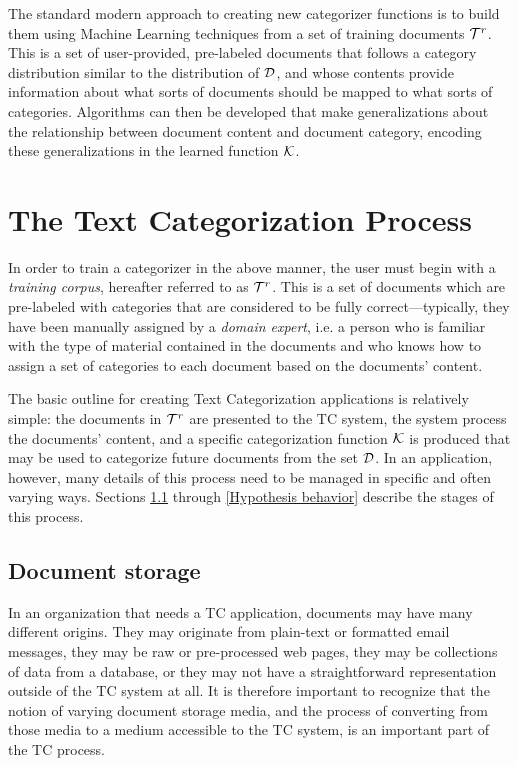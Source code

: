 The standard modern approach to creating new categorizer functions is
to build them using Machine Learning techniques from a set of training
documents $\mathcal{T}^r$. \cite[p. 2]{sebastiani:02} This is a set of
user-provided, pre-labeled documents that follows a category
distribution similar to the distribution of $\mathcal{D}$, and whose contents
provide information about what sorts of documents should be mapped to
what sorts of categories.  Algorithms can then be developed that make
generalizations about the relationship between document content and
document category, encoding these generalizations in the learned function $\mathcal{K}$.



\section{The Text Categorization Process}

In order to train a categorizer in the above manner, the user must
begin with a \emph{training corpus},
hereafter referred to as $\mathcal{T}^r$.  This is a set of documents which
are pre-labeled with categories that are considered to be fully
correct---typically, they have been manually assigned by a
\emph{domain expert}, i.e. a person who is familiar with the type of
material contained in the documents and who knows how to assign a set
of categories to each document based on the documents' content.

The basic outline for creating Text Categorization applications is relatively simple: the
documents in $\mathcal{T}^r$ are presented to the TC system, the system
process the documents' content, and a specific categorization
function $\mathcal{K}$ is produced that may be used to categorize future documents
from the set $\mathcal{D}$.  In an application, however, many details of
this process need to be managed in specific and often varying ways.
Sections \ref{Document storage} through \ref{Hypothesis behavior}
describe the stages of this process.

\subsection{Document storage}
\label{Document storage}

In an organization that needs a TC application, documents may have
many different origins.  They may originate from plain-text or
formatted email messages, they may be raw or pre-processed web pages,
they may be collections of data from a database, or they may not have
a straightforward representation outside of the TC system at all.  It
is therefore important to recognize that the notion of varying
document storage media, and the process of converting from those media
to a medium accessible to the TC system, is an important part of the
TC process.

